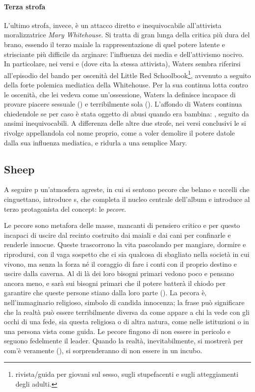 \documentclass[class=book, crop=false, oneside, 12pt]{standalone}
\begin{document}
    \paragraph{Terza strofa} L'ultimo strofa, invece, è un attacco diretto e inequivocabile all'attivista moralizzatrice \emph{Mary Whitehouse}. Si tratta di gran lunga della critica più dura del brano, essendo il terzo maiale la rappresentazione di quel potere latente e strisciante più difficile da arginare: l'influenza dei media e dell'attivismo nocivo. In particolare, nei versi  e  (dove cita la stessa attivista), Waters sembra riferirsi all'episodio del bando per oscenità del Little Red Schoolbook\footnote{rivista/guida per giovani sul sesso, sugli stupefacenti e sugli atteggiamenti degli adulti.}, avvenuto a seguito della forte polemica mediatica della Whitehouse. Per la sua continua lotta contro le oscenità, che lei vedeva come un'ossessione, Waters la definisce incapace di provare piacere sessuale () e terribilmente sola (). L'affondo di Waters continua chiedendole se per caso è stata oggetto di abusi quando era bambina: , seguito da ansimi inequivocabili. A differenza delle altre due strofe, nei versi conclusivi le si rivolge appellandola col nome proprio, come a voler demolire il potere datole dalla sua influenza mediatica, e ridurla a una semplice Mary.

    \subsection{Sheep}
    A seguire \acrshort{p} un'atmosfera agreste, in cui si sentono pecore che belano e uccelli che cinguettano, introduce \acrshort{s}, che completa il nucleo centrale dell'album e introduce al terzo protagonista del concept: le \emph{pecore}.

    Le pecore sono metafora  delle masse, mancanti di pensiero critico e per questo incapaci di uscire dal recinto costruito dai maiali e dai cani per confinarle e renderle innocue. Queste trascorrono la vita pascolando per mangiare, dormire e riprodursi, con il vaga sospetto che ci sia qualcosa di sbagliato nella società in cui vivono, ma senza la forza né il coraggio di fare i conti con il proprio destino e uscire dalla caverna. Al di là dei loro bisogni primari vedono poco e pensano ancora meno, e sarà sui bisogni primari che il potere batterà il chiodo per garantire che queste persone stiano dalla loro parte (). La pecora è, nell'immaginario religioso, simbolo di candida innocenza; la frase  può significare che la realtà può essere terribilmente diversa da come appare a chi la vede con gli occhi di una fede, sia questa religiosa o di altra natura, come nelle istituzioni o in una persona vista come guida. Le pecore fingono di non essere in pericolo e seguono fedelmente il leader. Quando la realtà, inevitabilmente, si mostrerà per com'è veramente (), si sorprenderanno di non essere in un incubo.
\end{document}
